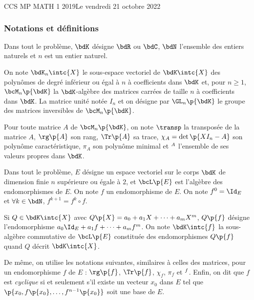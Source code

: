 \documentclass[a4paper,french,bookmarks]{article}
\begin{document}
    \renewcommand{\thesection}{\Roman{section}}
    \renewcommand{\thesubsection}{\thesection.\Alph{subsection}}
    \renewcommand{\labelenumi}{\Roman{section}.\arabic{enumi}.}
    \renewcommand*{\labelenumii}{\alph{enumii}.}

    {CCS MP MATH 1 2019}{Le vendredi 21 octobre 2022}
    
    \subsubsection*{Notations et définitions}
    
    \begin{enumerate}
        \itt Dans tout le problème, $\bdK$ désigne $\bdR$ ou $\bdC$, $\bdN$ l'ensemble des entiers naturels et $n$ est un entier naturel.
        
        \itt On note $\bdK_n\intc{X}$ le sous-espace vectoriel de $\bdK\intc{X}$ des polynômes de degré inférieur ou égal à $n$ à coefficients dans $\bdK$ et, pour $n \geq 1$, $\bcM_n\p{\bdK}$ la $\bdK$-algèbre des matrices carrées de taille $n$ à coefficients dans $\bdK$. La matrice unité notée $I_n$ et on désigne par $\GL_n\p{\bdK}$ le groupe des matrices inversibles de $\bcM_n\p{\bdK}$.
        
        \itt Pour toute matrice $A$ de $\bcM_n\p{\bdK}$, on note $\transp$ la transposée de la matrice $A$, $\rg\p{A}$ son rang, $\Tr\p{A}$ sa trace, $\chi_A = \det\p{XI_n - A}$ son polynôme caractéristique, $\pi_A$ son polynôme minimal et $\sp{A}$ l'ensemble de ses valeurs propres dans $\bdK$. 
        
        \itt Dans tout le problème, $E$ désigne un espace vectoriel sur le corps $\bdK$ de dimension finie $n$ supérieure ou égale à $2$, et $\bcL\p{E}$ est l'algèbre des endomorphismes de $E$. On note $f$ un endomorphisme de $E$. On note $f^0 = \Id_E$ et $\forall k \in \bdN$, $f^{k+1} = f^k \circ f$.
        
        \itt Si $Q \in \bdK\intc{X}$ avec $Q\p{X} = a_0 + a_1X + \dots + a_mX^m$, $Q\p{f}$ désigne l'endomorphisme $a_0\Id_E + a_1f + \dots + a_mf^m$. On note $\bdK\intc{f}$ la sous-algèbre commutative de $\bcL\p{E}$ constituée des endomorphismes $Q\p{f}$ quand $Q$ décrit $\bdK\intc{X}$.
        
        \itt De même, on utilise les notations suivantes, similaires à celles des matrices, pour un endomorphisme $f$ de $E$ : $\rg\p{f}$, $\Tr\p{f}$, $\chi_f$, $\pi_f$ et $\sp{f}$. Enfin, on dit que $f$ est \emph{cyclique} si et seulement s'il existe un vecteur $x_0$ dans $E$ tel que $\p{x_0, f\p{x_0}, \dots, f^{n-1}\p{x_0}}$ soit une base de $E$.
    \end{enumerate}
    
\end{document}
